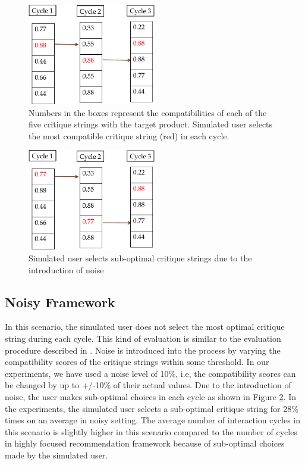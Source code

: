 \begin{figure}[h]
  \centering
  \captionsetup{justification=centering}
    \includegraphics[width=0.5\textwidth]{figures-bharath/focus.pdf}
  \caption{Numbers in the boxes represent the compatibilities of each of the five critique strings with the target product. Simulated user selects the most compatible critique string (red) in each cycle.}
\label{fig:focus}
\end{figure}

\begin{figure}[h]
  \centering
  \captionsetup{justification=centering}
    \includegraphics[width=0.5\textwidth]{figures-bharath/noisy.pdf}
  \caption{Simulated user selects sub-optimal critique strings due to the introduction of noise}
\label{fig:noisy}
\end{figure}

\subsection{Noisy Framework}
\label{sec:noisy}
In this scenario, the simulated user does not select the most optimal critique string during each cycle.
This kind of evaluation is similar to the evaluation procedure described in \cite{suggestion}.
Noise is introduced into the process by varying the compatibility scores of the critique strings within some threshold. 
In our experiments, we have used a noise level of 10\%, i.e, the compatibility scores can be changed by up to +/-10\% of their actual values.
Due to the introduction of noise, the user makes sub-optimal choices in each cycle as shown in Figure \ref{fig:noisy}.
In the experiments, the simulated user selects a sub-optimal critique string for 28\% times on an average in noisy setting.
The average number of interaction cycles in this scenario is slightly higher in this scenario compared to the number of cycles in highly focused recommendation framework because of sub-optimal choices made by the simulated user.


